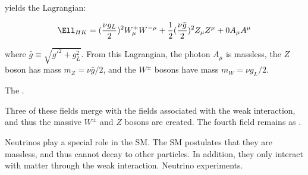 yields the Lagrangian:

\begin{equation}
	\Ell_{HK} = (\frac{\nu g_{L}}{2})^{2}W^{+}_{\mu}W^{-\mu} + \frac{1}{2}(\frac{\nu \bar{g}}{2})^{2}Z_{\mu}Z^{\mu} + 0A_{\mu}A^{\mu}
\end{equation}

where $\bar{g} \equiv \sqrt{g'^{2} + g^{2}_{L}}$.  From this Lagrangian, the photon $A_{\mu}$ is massless, 
the $Z$ boson has mass $m_{Z} = \nu\bar{g}/2$, and the $W^{\pm}$ bosons have mass $m_{W} = \nu g_{L}/2$.

The .







Three of these fields merge with the fields associated with the weak interaction, and thus the 
massive $W^{\pm}$ and $Z$ bosons are created.  The fourth field remains as .

Neutrinos play a special role in the SM.  The SM postulates that they are massless, and thus cannot decay 
to other particles.  In addition, they only interact with matter through the weak interaction.  Neutrino 
experiments.

